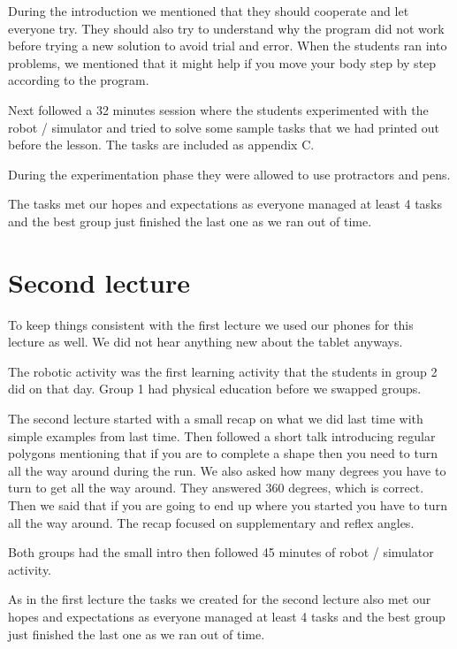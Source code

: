 \bigskip\noindent
During the introduction we mentioned that they should cooperate and let everyone try. They should also try to understand why the program did not work before trying a new solution to avoid trial and error. When the students ran into problems, we mentioned that it might help if you move your body step by step according to the program.

\bigskip\noindent
Next followed a 32 minutes session where the students experimented with the robot / simulator and tried to solve some sample tasks that we had printed out before the lesson. The tasks are included as appendix C.

\bigskip\noindent
During the experimentation phase they were allowed to use protractors and pens. 

\bigskip\noindent
The tasks met our hopes and expectations as everyone managed at least 4 tasks and the best group just finished the last one as we ran out of time. 

\section{Second lecture}
To keep things consistent with the first lecture we used our phones for this lecture as well. We did not hear anything new about the tablet anyways. 

\bigskip\noindent
The robotic activity was the first learning activity that the students in group 2 did on that day. 
Group 1 had physical education before we swapped groups.

\bigskip\noindent
The second lecture started with a small recap on what we did last time with simple examples from last time. Then followed a short talk introducing regular polygons mentioning that if you are to complete a shape then you need to turn all the way around during the run. We also asked how many degrees you have to turn to get all the way around. They answered 360 degrees, which is correct. Then we said that if you are going to end up where you started you have to turn all the way around. The recap focused on supplementary and reflex angles.

\bigskip\noindent
Both groups had the small intro then followed 45 minutes of robot / simulator activity. 

\bigskip\noindent
As in the first lecture the tasks we created for the second lecture also met our hopes and expectations as everyone managed at least 4 tasks and the best group just finished the last one as we ran out of time. 